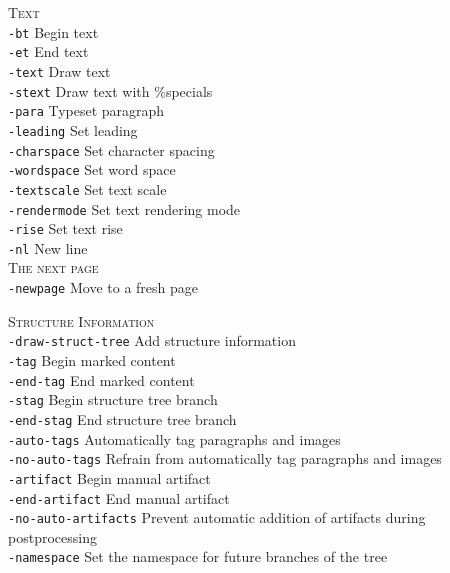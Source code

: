 \documentclass{book}
\begin{document}
{\begin{framed}
   \vspace{1.5mm}
   \noindent \textsc{Text}\\
   \noindent\verb!-bt! Begin text\\
   \noindent\verb!-et! End text\\
   \noindent\verb!-text! Draw text\\
   \noindent\verb!-stext! Draw text with \%specials\\
   \noindent\verb!-para! Typeset paragraph\\
   \noindent\verb!-leading! Set leading\\
   \noindent\verb!-charspace! Set character spacing\\
   \noindent\verb!-wordspace! Set word space\\
   \noindent\verb!-textscale! Set text scale\\
   \noindent\verb!-rendermode! Set text rendering mode\\
   \noindent\verb!-rise! Set text rise\\
   \noindent\verb!-nl! New line\\

   \vspace{1.5mm}
   \noindent \textsc{The next page}\\
   \noindent\verb!-newpage! Move to a fresh page

   \vspace{1.5mm}
   \noindent \textsc{Structure Information}\\
   \noindent\verb!-draw-struct-tree! Add structure information\\
   \noindent\verb!-tag! Begin marked content\\
   \noindent\verb!-end-tag! End marked content\\
   \noindent\verb!-stag! Begin structure tree branch\\
   \noindent\verb!-end-stag! End structure tree branch\\
   \noindent\verb!-auto-tags! Automatically tag paragraphs and images\\
   \noindent\verb!-no-auto-tags! Refrain from automatically tag paragraphs and images\\
   \noindent\verb!-artifact! Begin manual artifact\\
   \noindent\verb!-end-artifact! End manual artifact\\
   \noindent\verb!-no-auto-artifacts! Prevent automatic addition of artifacts during postprocessing\\
   \noindent\verb!-namespace! Set the namespace for future branches of the tree\\

  \end{framed}}
\end{document}
